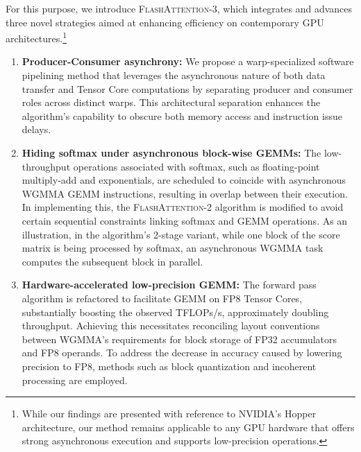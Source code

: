 For this purpose, we introduce \textsc{FlashAttention-3}, which integrates and advances three novel strategies aimed at enhancing efficiency on contemporary GPU architectures.\footnote{While our findings are presented with reference to NVIDIA’s Hopper architecture, our method remains applicable to any GPU hardware that offers strong asynchronous execution and supports low-precision operations.}

\begin{enumerate}

\item \textbf{Producer-Consumer asynchrony:} We propose a warp-specialized software pipelining method that leverages the asynchronous nature of both data transfer and Tensor Core computations by separating producer and consumer roles across distinct warps. This architectural separation enhances the algorithm’s capability to obscure both memory access and instruction issue delays.

\item \textbf{Hiding softmax under asynchronous block-wise GEMMs:} The low-throughput operations associated with softmax, such as floating-point multiply-add and exponentials, are scheduled to coincide with asynchronous WGMMA GEMM instructions, resulting in overlap between their execution. In implementing this, the \textsc{FlashAttention-2} algorithm is modified to avoid certain sequential constraints linking softmax and GEMM operations. As an illustration, in the algorithm’s 2-stage variant, while one block of the score matrix is being processed by softmax, an asynchronous WGMMA task computes the subsequent block in parallel.

\item \textbf{Hardware-accelerated low-precision GEMM:} The forward pass algorithm is refactored to facilitate GEMM on FP8 Tensor Cores, substantially boosting the observed TFLOPs/s, approximately doubling throughput. Achieving this necessitates reconciling layout conventions between WGMMA’s requirements for block storage of FP32 accumulators and FP8 operands. To address the decrease in accuracy caused by lowering precision to FP8, methods such as block quantization and incoherent processing are employed.
\end{enumerate}

